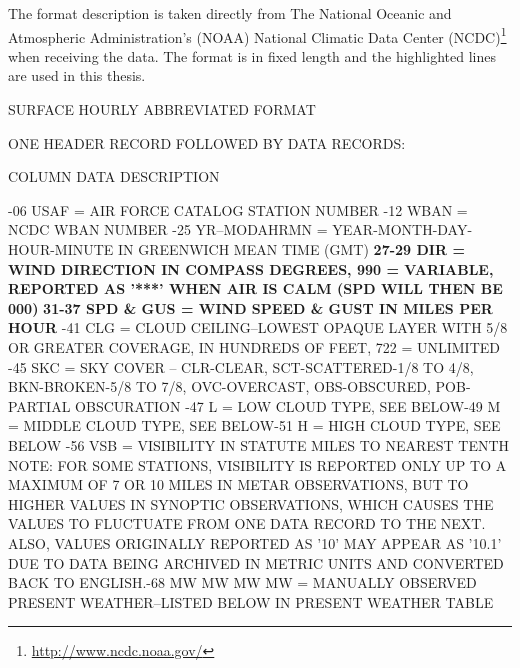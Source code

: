 The format description is taken directly from The National Oceanic and Atmospheric Administration's (NOAA) National Climatic Data Center (NCDC)\footnote{\url{http://www.ncdc.noaa.gov/}} when receiving the data. The format is in fixed length and the highlighted lines are used in this thesis. \newline 

\noindent SURFACE HOURLY ABBREVIATED FORMAT \newline

\noindent ONE HEADER RECORD FOLLOWED BY DATA RECORDS: \newline

\noindent COLUMN  DATA DESCRIPTION \newline

-06   USAF = AIR FORCE CATALOG STATION NUMBER -12   WBAN = NCDC WBAN NUMBER -25   YR--MODAHRMN = YEAR-MONTH-DAY-HOUR-MINUTE IN GREENWICH MEAN TIME (GMT) \newline
\textbf{27-29   DIR = WIND DIRECTION IN COMPASS DEGREES, 990 = VARIABLE, REPORTED AS
        '***' WHEN AIR IS CALM (SPD WILL THEN BE 000)} \newline
\textbf{31-37   SPD \& GUS = WIND SPEED \& GUST IN MILES PER HOUR} -41   CLG = CLOUD CEILING--LOWEST OPAQUE LAYER
        WITH 5/8 OR GREATER COVERAGE, IN HUNDREDS OF FEET,
        722 = UNLIMITED -45   SKC = SKY COVER -- CLR-CLEAR, SCT-SCATTERED-1/8 TO 4/8,
        BKN-BROKEN-5/8 TO 7/8, OVC-OVERCAST,
        OBS-OBSCURED, POB-PARTIAL OBSCURATION -47   L = LOW CLOUD TYPE, SEE BELOW-49   M = MIDDLE CLOUD TYPE, SEE BELOW-51   H = HIGH CLOUD TYPE, SEE BELOW  -56   VSB = VISIBILITY IN STATUTE MILES TO NEAREST TENTH
        NOTE: FOR SOME STATIONS, VISIBILITY IS REPORTED ONLY UP TO A
        MAXIMUM OF 7 OR 10 MILES IN METAR OBSERVATIONS, BUT TO HIGHER
        VALUES IN SYNOPTIC OBSERVATIONS, WHICH CAUSES THE VALUES TO 
        FLUCTUATE FROM ONE DATA RECORD TO THE NEXT.  ALSO, VALUES
        ORIGINALLY REPORTED AS '10' MAY APPEAR AS '10.1' DUE TO DATA
        BEING ARCHIVED IN METRIC UNITS AND CONVERTED BACK TO ENGLISH.-68   MW MW MW MW = MANUALLY OBSERVED PRESENT WEATHER--LISTED BELOW IN PRESENT WEATHER TABLE\newline

